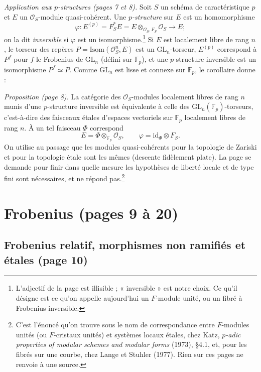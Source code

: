 \documentclass[11pt,a4paper]{article}
\begin{document}
\emph{Application aux $p$-structures (pages 7 et 8).} Soit $S$ un schéma de
caractéristique $p$ et $E$ un $\mathcal{O}_S$-module quasi-cohérent. Une
\emph{$p$-structure} sur $E$ est un homomorphisme
\[
\varphi : E^{(p)} = F_S^{*}E = E \otimes_{\mathcal{O}_S, F_S} \mathcal{O}_S
\longrightarrow E ;
\]
on la dit \emph{inversible} si $\varphi$ est un isomorphisme.\footnote{L'adjectif
de la page est illisible ; « inversible » est notre choix. Ce qu'il désigne
est ce qu'on appelle aujourd'hui un $F$-module unité, ou un fibré à
Frobenius inversible.} Si $E$ est localement libre de rang $n$, le torseur
des repères $P = \underline{\mathrm{Isom}}(\mathcal{O}_S^{n}, E)$ est un
$\mathrm{GL}_n$-torseur, $E^{(p)}$ correspond à $P^{f}$ pour $f$ le Frobenius
de $\mathrm{GL}_n$ (défini sur $\mathbb{F}_p$), et une $p$-structure
inversible est un isomorphisme $P^{f} \simeq P$. Comme $\mathrm{GL}_n$ est
lisse et connexe sur $\mathbb{F}_p$, le corollaire donne :

\emph{Proposition (page 8).} La catégorie des $\mathcal{O}_S$-modules
localement libres de rang $n$ munis d'une $p$-structure inversible est
équivalente à celle des $\mathrm{GL}_n(\mathbb{F}_p)$-torseurs, c'est-à-dire
des faisceaux étales d'espaces vectoriels sur $\mathbb{F}_p$ localement libres
de rang $n$. À un tel faisceau $\Phi$ correspond
\[
E = \Phi \otimes_{\mathbb{F}_p} \mathcal{O}_S, \qquad \varphi = \mathrm{id}_{\Phi}
\otimes F_S.
\]
On utilise au passage que les modules quasi-cohérents pour la topologie de
Zariski et pour la topologie étale sont les mêmes (descente fidèlement plate).
La page se demande pour finir dans quelle mesure les hypothèses de liberté
locale et de type fini sont nécessaires, et ne répond pas.\footnote{C'est
l'énoncé qu'on trouve sous le nom de correspondance entre $F$-modules unités
(ou $F$-cristaux unités) et systèmes locaux étales, chez Katz, \emph{$p$-adic
properties of modular schemes and modular forms} (1973), §4.1, et, pour les
fibrés sur une courbe, chez Lange et Stuhler (1977). Rien sur ces pages ne
renvoie à une source.}

\section*{Frobenius (pages 9 à 20)}

\subsection*{Frobenius relatif, morphismes non ramifiés et étales (page 10)}
\end{document}
